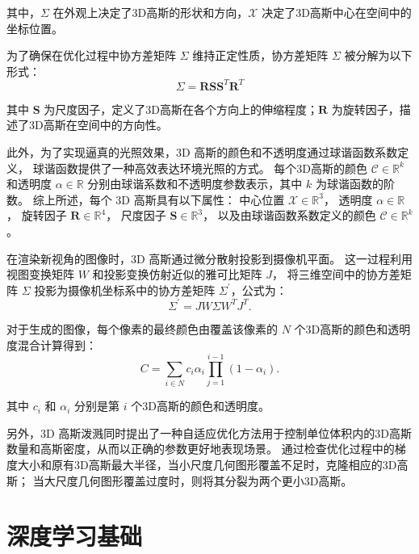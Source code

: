 其中，$\Sigma$ 在外观上决定了3D高斯的形状和方向，$\mathcal{X}$ 决定了3D高斯中心在空间中的坐标位置。

为了确保在优化过程中协方差矩阵 $\Sigma$ 维持正定性质，协方差矩阵 $\Sigma$ 被分解为以下形式：
\begin{equation}
\label{formula:covariance decomposition}
    \Sigma = \mathbf{R}\mathbf{S}\mathbf{S}^T\mathbf{R}^T
\end{equation}

其中 $\mathbf{S}$ 为尺度因子，定义了3D高斯在各个方向上的伸缩程度；$\mathbf{R}$ 为旋转因子，描述了3D高斯在空间中的方向性。

此外，为了实现逼真的光照效果，3D 高斯的颜色和不透明度通过球谐函数系数定义，
球谐函数提供了一种高效表达环境光照的方式。
每个3D高斯的颜色 $\mathcal{C} \in \mathbb{R}^k$ 和透明度 $\alpha \in \mathbb{R}$ 分别由球谐系数和不透明度参数表示，其中 $k$ 为球谐函数的阶数。
综上所述，每个 3D 高斯具有以下属性：
中心位置 $\mathcal{X} \in \mathbb{R}^3$，
透明度 $\alpha \in \mathbb{R}$，
旋转因子 $\mathbf{R} \in \mathbb{R}^4$，
尺度因子 $\mathbf{S} \in \mathbb{R}^3$，
以及由球谐函数系数定义的颜色 $\mathcal{C} \in \mathbb{R}^k$。

在渲染新视角的图像时，3D 高斯通过微分散射\cite{differential_splatting}投影到摄像机平面。
这一过程利用视图变换矩阵 $W$ 和投影变换仿射近似的雅可比矩阵 $J$，
将三维空间中的协方差矩阵 $\Sigma$ 投影为摄像机坐标系中的协方差矩阵 $\Sigma^{\prime}$，公式为：
\begin{equation}
    \Sigma^{\prime} = JW\Sigma W^TJ^T.
\end{equation} 

对于生成的图像，每个像素的最终颜色由覆盖该像素的 $N$ 个3D高斯的颜色和透明度混合计算得到：
\begin{equation}
\label{formula: splatting&volume rendering}
    C = \sum_{i\in N}c_i \alpha_i \prod_{j=1}^{i-1} (1-\alpha_i).
\end{equation}

其中 $c_i$ 和 $\alpha_i$ 分别是第 $i$ 个3D高斯的颜色和透明度。

另外，3D 高斯泼溅同时提出了一种自适应优化方法用于控制单位体积内的3D高斯数量和高斯密度，从而以正确的参数更好地表现场景。
通过检查优化过程中的梯度大小和原有3D高斯最大半径，当小尺度几何图形覆盖不足时，克隆相应的3D高斯；
当大尺度几何图形覆盖过度时，则将其分裂为两个更小3D高斯。

\section{深度学习基础}
